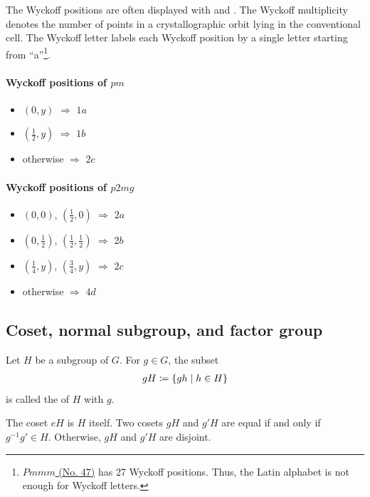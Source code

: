 The Wyckoff positions are often displayed with  and .
The Wyckoff multiplicity denotes the number of points in a crystallographic orbit lying in the conventional cell.
The Wyckoff letter labels each Wyckoff position by a single letter starting from ``a''\footnote{
  \href{https://www.cryst.ehu.es/cgi-bin/cryst/programs/nph-wp-list}{$Pmmm$ (No. 47)} has 27 Wyckoff positions.
  Thus, the Latin alphabet is not enough for Wyckoff letters.
}.

\paragraph{Wyckoff positions of $pm$}

\begin{itemize}
  \item $(0, y)$ $\Rightarrow$ $1a$
  \item $\left( \frac{1}{2}, y \right)$ $\Rightarrow$ $1b$
  \item otherwise $\Rightarrow$ $2c$
\end{itemize}

\paragraph{Wyckoff positions of $p2mg$}

\begin{itemize}
  \item $(0, 0)$, $\left( \frac{1}{2}, 0 \right)$ $\Rightarrow$ $2a$
  \item $\left( 0, \frac{1}{2} \right)$, $\left( \frac{1}{2}, \frac{1}{2} \right)$ $\Rightarrow$ $2b$
  \item $\left( \frac{1}{4}, y \right)$, $\left( \frac{3}{4}, y \right)$ $\Rightarrow$ $2c$
  \item otherwise $\Rightarrow$ $4d$
\end{itemize}

\subsection{Coset, normal subgroup, and factor group}

\begin{screen}
  \begin{defn}[coset]
    Let $H$ be a subgroup of $G$.
    For $g \in G$, the subset
    \begin{align}
      gH \coloneqq \left\{  gh  \mathrel{}\middle|\mathrel{}  h \in H \right\}
    \end{align}
    is called the  of $H$ with  $g$.
  \end{defn}
\end{screen}
The coset $eH$ is $H$ itself.
Two cosets $gH$ and $g'H$ are equal if and only if $g^{-1}g' \in H$.
Otherwise, $gH$ and $g'H$ are disjoint.

